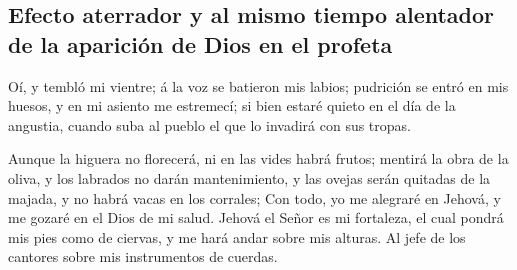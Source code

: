 \hypertarget{efecto-aterrador-y-al-mismo-tiempo-alentador-de-la-apariciuxf3n-de-dios-en-el-profeta}{%
\subsection{Efecto aterrador y al mismo tiempo alentador de la aparición
de Dios en el
profeta}\label{efecto-aterrador-y-al-mismo-tiempo-alentador-de-la-apariciuxf3n-de-dios-en-el-profeta}}

 Oí, y tembló mi vientre; á la voz se batieron mis
labios; pudrición se entró en mis huesos, y en mi asiento me estremecí;
si bien estaré quieto en el día de la angustia, cuando suba al pueblo el
que lo invadirá con sus tropas.

 Aunque la higuera no florecerá, ni en las vides habrá
frutos; mentirá la obra de la oliva, y los labrados no darán
mantenimiento, y las ovejas serán quitadas de la majada, y no habrá
vacas en los corrales;  Con todo, yo me alegraré en
Jehová, y me gozaré en el Dios de mi salud.  Jehová el
Señor es mi fortaleza, el cual pondrá mis pies como de ciervas, y me
hará andar sobre mis alturas. Al jefe de los cantores sobre mis
instrumentos de cuerdas.
